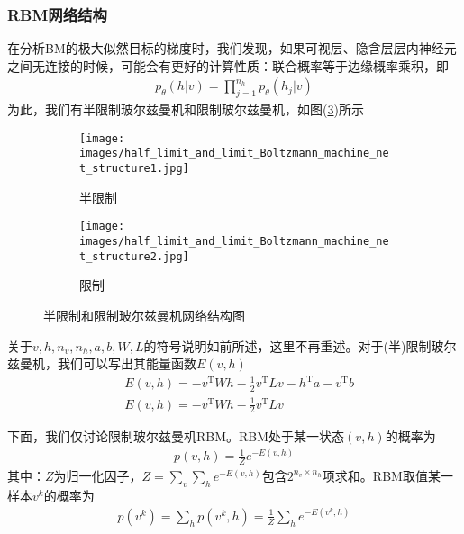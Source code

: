         \subsubsection{RBM网络结构}
            \par
            在分析BM的极大似然目标的梯度时，我们发现，如果可视层、隐含层层内神经元之间无连接的时候，可能会有更好的计算性质：联合概率等于边缘概率乘积，即
            \begin{align*}
            p_\theta(h|v) = \prod_{j=1}^{n_h}p_\theta(h_j|v)
            \end{align*}
            为此，我们有半限制玻尔兹曼机和限制玻尔兹曼机，如图(\ref{fig:半限制和限制玻尔兹曼机网络结构图})所示
\begin{figure}[H]
    \centering
    \begin{subfigure}[b]{0.4\textwidth}
        \texttt{[image: images/half\_limit\_and\_limit\_Boltzmann\_machine\_net\_structure1.jpg]}
        \caption{半限制}
        \label{fig:半限制}
    \end{subfigure}
    \quad
    \begin{subfigure}[b]{0.4\textwidth}
        \texttt{[image: images/half\_limit\_and\_limit\_Boltzmann\_machine\_net\_structure2.jpg]}
        \caption{限制}
        \label{fig:限制}
    \end{subfigure}
    \caption{半限制和限制玻尔兹曼机网络结构图}
    \label{fig:半限制和限制玻尔兹曼机网络结构图}
\end{figure}
            关于$v,h,n_v,n_h,a,b,W,L$的符号说明如前所述，这里不再重述。对于(半)限制玻尔兹曼机，我们可以写出其能量函数$E(v,h)$
            \begin{align*}
            & E(v,h) = -v^\mathrm{T}Wh - \frac{1}{2} v^\mathrm{T}Lv - h^\mathrm{T}a - v^\mathrm{T}b\\
            & E(v,h) = -v^\mathrm{T}Wh - \frac{1}{2} v^\mathrm{T}Lv
            \end{align*}
            \par
            下面，我们仅讨论限制玻尔兹曼机RBM。RBM处于某一状态$(v,h)$的概率为
            \begin{align*}
            p(v,h) = \frac{1}{Z} e^{-E(v,h)}
            \end{align*}
            其中：$Z$为归一化因子，$Z = \sum_v\sum_he^{-E(v,h)}$包含$2^{n_v\times n_h}$项求和。RBM取值某一样本$v^k$的概率为
            \begin{align*}
            p(v^k) = \sum_h p(v^k,h) = \frac{1}{Z}\sum_he^{-E(v^k,h)}
            \end{align*}
